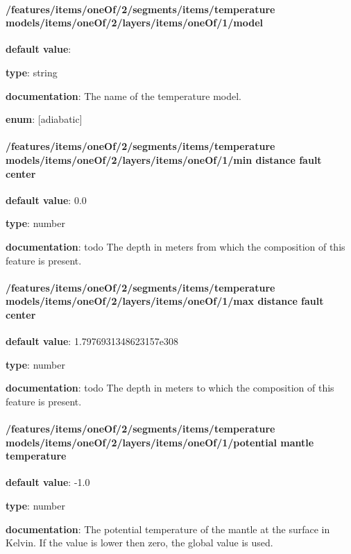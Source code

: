 \paragraph{/features/items/oneOf/2/segments/items/temperature models/items/oneOf/2/layers/items/oneOf/1/model} \begin{itemized}
\item {\bf default value}: 
\item {\bf type}: string
\item {\bf documentation}: The name of the temperature model.
\item {\bf enum}: [adiabatic]\end{itemized}\paragraph{/features/items/oneOf/2/segments/items/temperature models/items/oneOf/2/layers/items/oneOf/1/min distance fault center} \begin{itemized}
\item {\bf default value}: 0.0
\item {\bf type}: number
\item {\bf documentation}: todo The depth in meters from which the composition of this feature is present.
\end{itemized}\paragraph{/features/items/oneOf/2/segments/items/temperature models/items/oneOf/2/layers/items/oneOf/1/max distance fault center} \begin{itemized}
\item {\bf default value}: 1.7976931348623157e308
\item {\bf type}: number
\item {\bf documentation}: todo The depth in meters to which the composition of this feature is present.
\end{itemized}\paragraph{/features/items/oneOf/2/segments/items/temperature models/items/oneOf/2/layers/items/oneOf/1/potential mantle temperature} \begin{itemized}
\item {\bf default value}: -1.0
\item {\bf type}: number
\item {\bf documentation}: The potential temperature of the mantle at the surface in Kelvin. If the value is lower then zero, the global value is used.

\end{itemized}
